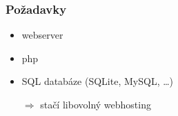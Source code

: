 \documentclass{beamer}
\begin{document}

\begin{frame}[t]
\frametitle{Požadavky}
\begin{itemize}
\item webserver
\item php
\item SQL databáze (SQLite, MySQL, \dots)
\vspace{.5cm}
\item[\(\Rightarrow\)] stačí libovolný webhosting
\end{itemize}
\end{frame}


\end{document}
